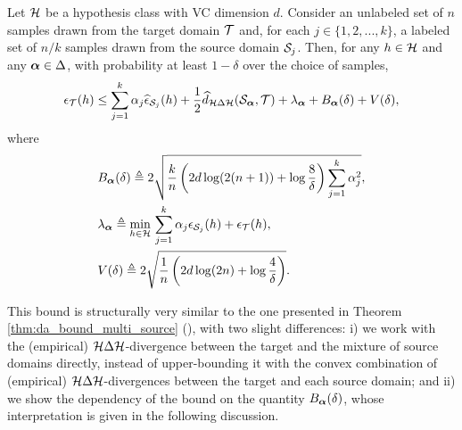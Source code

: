 \begin{theorem}
    \label{thm:target_risk_bound}
    Let ${\mathcal{H}}$ be a hypothesis class with VC dimension $d$. Consider an unlabeled set of $n$ samples drawn from the target domain ${\mathcal{T}}$ and, for each $j \in \{1,2,...,k\}$, a labeled set of $n/k$ samples drawn from the source domain ${\mathcal{S}}_j$. Then, for any $h \in {\mathcal{H}}$ and any ${\bm{\alpha}} \in \Delta$, with probability at least $1-\delta$ over the choice of samples,
    \begin{equation}
        \label{eq:bound}
        \epsilon_{\mathcal{T}}(h) \leq \sum_{j=1}^k \alpha_j \widehat{\epsilon}_{{\mathcal{S}}_j}(h) + \frac{1}{2} \widehat{d}_{{\mathcal{H}} \Delta {\mathcal{H}}}({\mathcal{S}}_{\bm{\alpha}}, {\mathcal{T}}) + \lambda_{\bm{\alpha}} + B_{\bm{\alpha}}(\delta) + V(\delta),
    \end{equation}
    where
    \begin{align}
        &B_{\bm{\alpha}}(\delta) \triangleq 2\sqrt{\frac{k}{n}\left(2d \log(2(n+1)) + \log\frac{8}{\delta}\right)\sum_{j=1}^k {\alpha}_j^2}, \\
        &\lambda_{\bm{\alpha}} \triangleq \min_{h \in {\mathcal{H}}}\, \sum_{j=1}^k {\alpha}_j \epsilon_{{\mathcal{S}}_j}(h) + \epsilon_{{\mathcal{T}}}(h), \\
        &V(\delta) \triangleq 2 \sqrt{\frac{1}{n} \left( 2d\log(2n) + \log\frac{4}{\delta} \right)}.
    \end{align}
\end{theorem}
This bound is structurally very similar to the one presented in Theorem \ref{thm:da_bound_multi_source} (\citet{Zhao2018}), with two slight differences: i) we work with the (empirical) ${\mathcal{H}} \Delta {\mathcal{H}}$-divergence between the target and the mixture of source domains directly, instead of upper-bounding it with the convex combination of (empirical) ${\mathcal{H}} \Delta {\mathcal{H}}$-divergences between the target and each source domain; and ii) we show the dependency of the bound on the quantity $B_{\bm{\alpha}}(\delta)$, whose interpretation is given in the following discussion.

